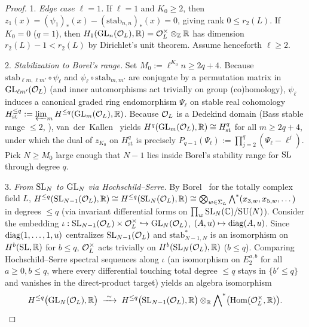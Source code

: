 \begin{proof}
1. \emph{Edge case $\ell = 1$.} If $\ell = 1$ and $K_0 \ge 2$, then $z_1(x) = (\psi_1)_*(x) - (\mathrm{stab}_{n,n})_*(x) = 0$, giving rank $0 \le r_2(L)$. If $K_0 = 0$ ($q = 1$), then $H_1(\mathrm{GL}_n(\mathcal{O}_L), \mathbb{R}) = \mathcal{O}_L^\times \otimes_{\mathbb{Z}} \mathbb{R}$ has dimension $r_2(L) - 1 < r_2(L)$ by Dirichlet's unit theorem. Assume henceforth $\ell \ge 2$.

2. \emph{Stabilization to Borel's range.} Set $M_0 := \ell^{K_0} n \ge 2q + 4$. Because $\mathrm{stab}_{\ell m, \ell m'} \circ \psi_\ell$ and $\psi_\ell \circ \mathrm{stab}_{m, m'}$ are conjugate by a permutation matrix in $\mathrm{GL}_{\ell m'}(\mathcal{O}_L)$ (and inner automorphisms act trivially on group (co)homology), $\psi_\ell$ induces a canonical graded ring endomorphism $\Psi_\ell$ on stable real cohomology $H^{\le q}_{\mathrm{st}} := \varprojlim_m H^{\le q}(\mathrm{GL}_m(\mathcal{O}_L), \mathbb{R})$. Because $\mathcal{O}_L$ is a Dedekind domain (Bass stable range $\le 2$, \cite{Bass1964}), van~der~Kallen~\cite[Theorem~4.11]{vanderKallen1980} yields $H^q(\mathrm{GL}_m(\mathcal{O}_L), \mathbb{R}) \cong H^q_{\mathrm{st}}$ for all $m \ge 2q + 4$, under which the dual of $z_{K_0}$ on $H^q_{\mathrm{st}}$ is precisely $P_{q-1}(\Psi_\ell) := \prod_{j=2}^{q}(\Psi_\ell - \ell^j)$. Pick $N \ge M_0$ large enough that $N - 1$ lies inside Borel's stability range for $\mathrm{SL}$ through degree $q$.

3. \emph{From $\mathrm{SL}_N$ to $\mathrm{GL}_N$ via Hochschild--Serre.} By Borel~\cite[Theorem~7.5 \& \S12.2]{Borel1974} for the totally complex field $L$, $H^{\le q}(\mathrm{SL}_{N-1}(\mathcal{O}_L), \mathbb{R}) \cong H^{\le q}(\mathrm{SL}_N(\mathcal{O}_L), \mathbb{R}) \cong \bigotimes_{w \in \Sigma_L}\bigwedge^*(x_{3,w}, x_{5,w}, \dots)$ in degrees $\le q$ (via invariant differential forms on $\prod_w \mathrm{SL}_N(\mathbb{C})/\mathrm{SU}(N)$). Consider the embedding $\iota : \mathrm{SL}_{N-1}(\mathcal{O}_L) \times \mathcal{O}_L^\times \hookrightarrow \mathrm{GL}_N(\mathcal{O}_L)$, $(A, u) \mapsto \operatorname{diag}(A, u)$. Since $\operatorname{diag}(1, \dots, 1, u)$ centralizes $\mathrm{SL}_{N-1}(\mathcal{O}_L)$ and $\mathrm{stab}_{N-1, N}^*$ is an isomorphism on $H^b(\mathrm{SL}, \mathbb{R})$ for $b \le q$, $\mathcal{O}_L^\times$ acts trivially on $H^b(\mathrm{SL}_N(\mathcal{O}_L), \mathbb{R})$ ($b \le q$). Comparing Hochschild--Serre spectral sequences along $\iota$ (an isomorphism on $E_2^{a, b}$ for all $a \ge 0, b \le q$, where every differential touching total degree $\le q$ stays in $\{b' \le q\}$ and vanishes in the direct-product target) yields an algebra isomorphism
\[
  H^{\le q}\bigl(\mathrm{GL}_N(\mathcal{O}_L), \mathbb{R}\bigr) \;\xrightarrow{\;\sim\;}\;
  H^{\le q}\bigl(\mathrm{SL}_{N-1}(\mathcal{O}_L), \mathbb{R}\bigr) \otimes_{\mathbb{R}} \bigwedge\nolimits^*\bigl(\mathrm{Hom}(\mathcal{O}_L^\times, \mathbb{R})\bigr).
\]


\end{proof}
